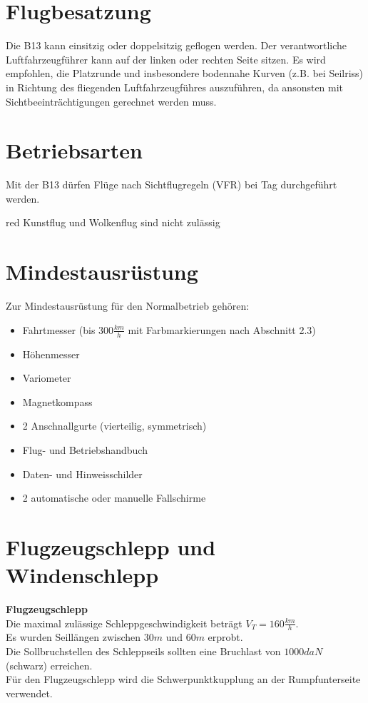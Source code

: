 \section{Flugbesatzung}
Die B13 kann einsitzig oder doppelsitzig geflogen werden. Der verantwortliche Luftfahrzeugführer kann auf der linken oder rechten Seite sitzen. Es wird empfohlen, die Platzrunde und insbesondere bodennahe Kurven (z.B. bei Seilriss) in Richtung des fliegenden Luftfahrzeugführes auszuführen, da ansonsten mit Sichtbeeinträchtigungen gerechnet werden muss.

\section{Betriebsarten}
Mit der B13 dürfen Flüge nach Sichtflugregeln (VFR) bei Tag durchgeführt werden.\\
\newline
\begin{color}{red} Kunstflug und Wolkenflug sind nicht zulässig
\end{color}

\section{Mindestausrüstung}
Zur Mindestausrüstung für den Normalbetrieb gehören:\\
\begin{itemize}
\item Fahrtmesser (bis $300\frac{km}{h}$ mit Farbmarkierungen nach Abschnitt 2.3)
\item Höhenmesser
\item Variometer
\item Magnetkompass
\item 2 Anschnallgurte (vierteilig, symmetrisch)
\item Flug- und Betriebshandbuch
\item Daten- und Hinweisschilder
\item 2 automatische oder manuelle Fallschirme
\end{itemize}

\section{Flugzeugschlepp und Windenschlepp}

\textbf{Flugzeugschlepp}\\
Die maximal zulässige Schleppgeschwindigkeit beträgt $V_T=160\frac{km}{h}$.\\
Es wurden Seillängen zwischen $30m$ und $60m$ erprobt.\\
Die Sollbruchstellen des Schleppseils sollten eine Bruchlast von $1000daN$ (schwarz) erreichen.\\
Für den Flugzeugschlepp wird die Schwerpunktkupplung an der Rumpfunterseite verwendet.\\

